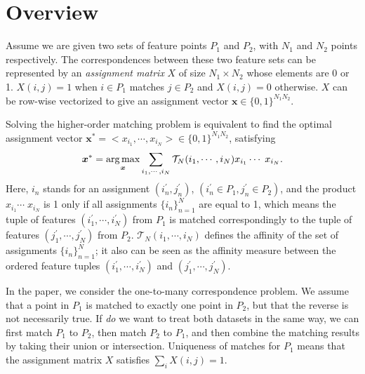 \section{Overview}
\label{sec:overview}

Assume we are given two sets of feature points $P_1$ and $P_2$, with $N_1$  and $N_2$ points respectively.
The correspondences between these two feature sets can be represented by an \emph{assignment matrix} $X$ of size $N_1 \times N_2$ whose elements are 0 or 1.
$X(i,j)=1$ when $i \in P_1$ matches $j \in P_2$ and $X(i,j)=0$ otherwise. $X$ can be row-wise vectorized to give an assignment vector $\boldsymbol{x} \in \{0,1\}^{N_1N_2}$.

Solving the higher-order matching problem is equivalent to find the optimal assignment vector ${\boldsymbol{x}}^*=<x_{i_1},\cdots,x_{i_N}> \in \{0,1\}^{N_1N_2}$, satisfying
\begin{equation}
\label{equ:assigment}
  {\boldsymbol{x}}^* = \operatorname*{arg\,max}_{\boldsymbol{x}}  \sum_{i_1,\cdots,i_N} \mathcal{T}_N(i_1,\cdots,i_N) x_{i_1}  \cdots\; x_{i_N}.
\end{equation}
Here, $i_n$ stands for an assignment $(i^{'}_n,j^{'}_n)$, $(i^{'}_n\in P_1,j^{'}_n\in P_2)$, and the
product $x_{i_1}  \cdots\;x_{i_N}$ is 1 only if all assignments $\{i_n\}_{n=1}^N$ are equal to 1, which means the tuple of features $(i^{'}_1,\cdots,i^{'}_N)$ from $P_1$ is matched correspondingly to the tuple of features $(j^{'}_1,\cdots,j^{'}_N)$ from $P_2$.
$\mathcal{T}_N(i_1,\cdots,i_N)$ defines the affinity of the set of assignments $\{i_n\}_{n=1}^N$; 
it also can be seen as the affinity measure between the ordered feature tuples $(i^{'}_1,\cdots,i^{'}_N)$  and $(j^{'}_1,\cdots,j^{'}_N)$.

In the paper, we consider the one-to-many correspondence problem. 
We assume that a point in $P_1$ is matched to exactly one point in $P_2$, but that the reverse is not necessarily true.
If \emph{do} we want to treat both datasets in the same way,
we can first match $P_1$ to $P_2$, then match $P_2$ to $P_1$, and then combine the matching results by taking their union or intersection.
Uniqueness of matches for $P_1$ means that the assignment matrix $X$ satisfies $\sum\nolimits_i X(i,j)=1$.

